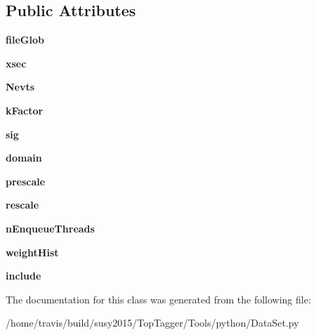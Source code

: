 \subsection*{Public Attributes}
\begin{DoxyCompactItemize}
\item 
\hypertarget{classDataSet_1_1DataSet_a31312e7ebc75a63846784ead3f5cf8d1}{{\bfseries file\-Glob}}\label{classDataSet_1_1DataSet_a31312e7ebc75a63846784ead3f5cf8d1}

\item 
\hypertarget{classDataSet_1_1DataSet_ada08c6b544a58467403e9ab421057b5f}{{\bfseries xsec}}\label{classDataSet_1_1DataSet_ada08c6b544a58467403e9ab421057b5f}

\item 
\hypertarget{classDataSet_1_1DataSet_a69beaca98bb3ebb6061af614c70c5a80}{{\bfseries Nevts}}\label{classDataSet_1_1DataSet_a69beaca98bb3ebb6061af614c70c5a80}

\item 
\hypertarget{classDataSet_1_1DataSet_a6813ebb37a959a59becf21a06fda7e1f}{{\bfseries k\-Factor}}\label{classDataSet_1_1DataSet_a6813ebb37a959a59becf21a06fda7e1f}

\item 
\hypertarget{classDataSet_1_1DataSet_aadcca5cbd9d7962486695097ea39f34b}{{\bfseries sig}}\label{classDataSet_1_1DataSet_aadcca5cbd9d7962486695097ea39f34b}

\item 
\hypertarget{classDataSet_1_1DataSet_a10068706fbc43da752a9a839cdedff1a}{{\bfseries domain}}\label{classDataSet_1_1DataSet_a10068706fbc43da752a9a839cdedff1a}

\item 
\hypertarget{classDataSet_1_1DataSet_a483dac2804e4ea9d834d944ba9d5664e}{{\bfseries prescale}}\label{classDataSet_1_1DataSet_a483dac2804e4ea9d834d944ba9d5664e}

\item 
\hypertarget{classDataSet_1_1DataSet_ac5ea1a521dbffb539f7ccce804b64393}{{\bfseries rescale}}\label{classDataSet_1_1DataSet_ac5ea1a521dbffb539f7ccce804b64393}

\item 
\hypertarget{classDataSet_1_1DataSet_a290520ed790c13b0b0eb84a3530f9167}{{\bfseries n\-Enqueue\-Threads}}\label{classDataSet_1_1DataSet_a290520ed790c13b0b0eb84a3530f9167}

\item 
\hypertarget{classDataSet_1_1DataSet_afc8436a9d89b2ac89ca52552827303c3}{{\bfseries weight\-Hist}}\label{classDataSet_1_1DataSet_afc8436a9d89b2ac89ca52552827303c3}

\item 
\hypertarget{classDataSet_1_1DataSet_a0202fc17b2e4e3ba83e8129d9932b989}{{\bfseries include}}\label{classDataSet_1_1DataSet_a0202fc17b2e4e3ba83e8129d9932b989}

\end{DoxyCompactItemize}


The documentation for this class was generated from the following file\-:\begin{DoxyCompactItemize}
\item 
/home/travis/build/susy2015/\-Top\-Tagger/\-Tools/python/Data\-Set.\-py\end{DoxyCompactItemize}
